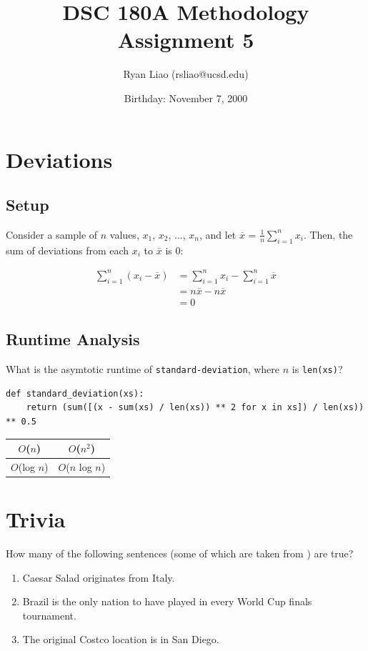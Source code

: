 \documentclass{article}
\title{DSC 180A Methodology Assignment 5}
\author{Ryan Liao (rsliao@ucsd.edu)}
\date{Birthday: November 7, 2000}
\begin{document}
\maketitle

\section{Deviations}
\subsection{Setup}
Consider a sample of $n$ values, $x_1$, $x_2$, ..., $x_n$, and let $\overline{x}$ = $\frac{1}{n}\sum_{i=1}^{n}x_i$. Then, the sum of deviations from each $x_i$ to $\overline{x}$ is 0:

\begin{align*}
\sum_{i=1}^{n}(x_i - \overline{x}) &= \sum_{i=1}^{n}x_i - \sum_{i=1}^{n}\overline{x}\\
&= n\overline{x} - n\overline{x}\\
&= \boxed{0}
\end{align*}

\subsection{Runtime Analysis}
What is the asymtotic runtime of \texttt{standard-deviation}, where $n$ is \texttt{len(xs)}?
\begin{verbatim}
def standard_deviation(xs):
    return (sum([(x - sum(xs) / len(xs)) ** 2 for x in xs]) / len(xs)) ** 0.5
\end{verbatim}

\begin{tabular}{ |c|c| } 
\hline
$O$($n$) & $O$($n^2$) \\ 
\hline
$O$(log $n$) & $O$($n$ log $n$) \\
\hline
\end{tabular}

\section{Trivia}
How many of the following sentences (some of which are taken from ) are true?
\begin{enumerate}
    \item Caesar Salad originates from Italy.
    \item Brazil is the only nation to have played in every World Cup finals tournament.
    \item The original Costco location is in San Diego.
\end{enumerate}
\end{document}
